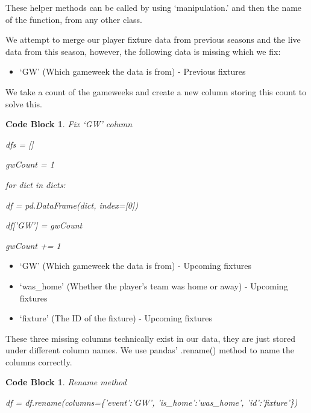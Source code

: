 \documentclass[12pt, a4paper, oneside]{book}
\newtheorem{codeblock}[theorem]{Code Block}
\numberwithin{equation}{section}
\begin{document}
These helper methods can be called by using `manipulation.' and then the name of the function, from any other class.

\vspace{0.5cm}

We attempt to merge our player fixture data from previous seasons and the live data from this season, however, the following data is missing which we fix:

\begin{itemize}
  \item `GW' (Which gameweek the data is from) - Previous fixtures
\end{itemize}

We take a count of the gameweeks and create a new column storing this count to solve this.

\begin{codeblock}
  Fix `GW' column

  dfs = []

  gwCount = 1
  
  for dict in dicts:
  
  \hspace{\parindent}df = pd.DataFrame(dict, index=[0])
  
  \hspace{\parindent}df['GW'] = gwCount
  
  \hspace{\parindent}gwCount += 1
\end{codeblock}

\vspace{0.5cm}

\begin{itemize}
  \item `GW' (Which gameweek the data is from) - Upcoming fixtures
  \item `was\_home' (Whether the player's team was home or away) - Upcoming fixtures
  \item `fixture' (The ID of the fixture) - Upcoming fixtures
\end{itemize}

These three missing columns technically exist in our data, they are just stored under different column names. We use pandas' .rename() method to name the columns correctly.

\begin{codeblock}
  Rename method

  df = df.rename(columns=\{'event':'GW', 'is\_home':'was\_home', 'id':'fixture'\})
\end{codeblock}
\end{document}
